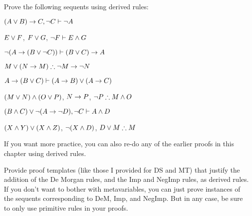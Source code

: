 \problempart 
Prove the following sequents using derived rules:
\begin{earg}
\item $(A \vee B) \rightarrow C , \neg C \vdash \neg A$
\item $E\vee F$, $F\vee G$, $\neg F \vdash E \wedge G$
\item $\neg (A \rightarrow (B \vee \neg C)) \vdash (B \vee C) \rightarrow A$
\item $M\vee(N\rightarrow M) \therefore \neg M \rightarrow \neg N$
\item $A \rightarrow (B \vee C) \vdash (A \rightarrow B) \vee (A \rightarrow C)$
\item $(M \vee N) \wedge (O \vee P)$, $N \rightarrow P$, $\neg P \therefore M\wedge O$
\item $(B \wedge C) \vee \neg (A \rightarrow \neg D), \neg C \vdash A \wedge D$
\item $(X\wedge Y)\vee(X\wedge Z)$, $\neg(X\wedge D)$, $D\vee M \therefore M$
\end{earg}
If you want more practice, you can also re-do any of the earlier proofs in this chapter using derived rules.

\problempart
Provide proof templates (like those I provided for DS and MT) that justify the addition of the De Morgan rules, and the Imp and NegImp rules, as derived rules. If you don't want to bother with metavariables, you can just prove instances of the sequents corresponding to DeM, Imp, and NegImp.  But in any case, be sure to only use primitive rules in your proofs.


